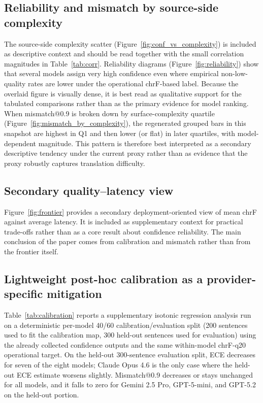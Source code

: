 \documentclass[10pt,conference]{IEEEtran}
\begin{document}
\subsection{Reliability and mismatch by source-side complexity}
The source-side complexity scatter (Figure~\ref{fig:conf_vs_complexity}) is included as descriptive context and should be read together with the small correlation magnitudes in Table~\ref{tab:corr}. Reliability diagrams (Figure~\ref{fig:reliability}) show that several models assign very high confidence even where empirical non-low-quality rates are lower under the operational chrF-based label. Because the overlaid figure is visually dense, it is best read as qualitative support for the tabulated comparisons rather than as the primary evidence for model ranking. When mismatch@0.9 is broken down by surface-complexity quartile (Figure~\ref{fig:mismatch_by_complexity}), the regenerated grouped bars in this snapshot are highest in Q1 and then lower (or flat) in later quartiles, with model-dependent magnitude. This pattern is therefore best interpreted as a secondary descriptive tendency under the current proxy rather than as evidence that the proxy robustly captures translation difficulty.

\subsection{Secondary quality--latency view}
Figure~\ref{fig:frontier} provides a secondary deployment-oriented view of mean chrF against average latency. It is included as supplementary context for practical trade-offs rather than as a core result about confidence reliability. The main conclusion of the paper comes from calibration and mismatch rather than from the frontier itself.

\subsection{Lightweight post-hoc calibration as a provider-specific mitigation}
Table~\ref{tab:calibration} reports a supplementary isotonic regression analysis run on a deterministic per-model 40/60 calibration/evaluation split (200 sentences used to fit the calibration map, 300 held-out sentences used for evaluation) using the already collected confidence outputs and the same within-model chrF-q20 operational target. On the held-out 300-sentence evaluation split, ECE decreases for seven of the eight models; Claude Opus 4.6 is the only case where the held-out ECE estimate worsens slightly. Mismatch@0.9 decreases or stays unchanged for all models, and it falls to zero for Gemini 2.5 Pro, GPT-5-mini, and GPT-5.2 on the held-out portion.
\end{document}
